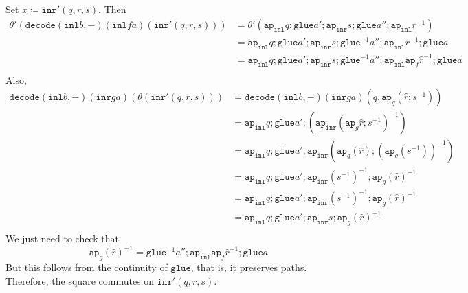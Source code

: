 \message{ !name(notes.tex)}\documentclass[12pt]{amsart}
\newcommand{\inv}{^{-1}}
\newcommand{\type}[1]{\mathtt{#1}}
\newcommand{\ap}{\type{ap}}
\newcommand{\inl}{\type{inl}}
\newcommand{\inr}{\type{inr}}
\newcommand{\glue}{\type{glue}}
\newcommand{\decode}{\type{decode}}
\theoremstyle{remark}
\theoremstyle{definition}
\begin{document}
Set \( x \coloneqq \inr' ( q,r,s ) \). Then
\begin{align*}
  \theta' ( \decode (\inl b,-) ( \inl fa ) ( \inr' ( q,r,s ) ) )
  & = \theta' ( \ap_{\inl} q ; \glue a' ; \ap_{\inr} s ; \glue a'' ;
    \ap_{\inl} r^{-1} ) \\
  & =  \ap_{\inl} q ; \glue a' ; \ap_{\inr} s ; \glue^{-1} a'' ;
    \ap_{\inl} r^{-1} ; \glue a \\
   & =  \ap_{\inl} q ; \glue a' ; \ap_{\inr} s ; \glue^{-1} a'' ;
    \ap_{\inl} \ap_f \hat{r}^{-1} ; \glue a \\
\end{align*}
Also,
\begin{align*}
  \decode ( \inl b , - ) ( \inr ga ) ( \theta ( \inr' ( q,r,s ) ) )
  & = \decode ( \inl b , - )( \inr ga )( q , \ap_g ( \hat{r} ; s^{-1}
    ) ) \\
  & = \ap_{\inl} q ; \glue a' ; ( \ap_{\inr} ( \ap_g \hat{r} ; s^{-1} )^{-1} ) \\
  & = \ap_{\inl} q ; \glue a' ; \ap_{\inr} ( \ap_g ( \hat{r} ) ; ( \ap_g
    (s^{-1}) )^{-1} ) \\
  & = \ap_{\inl} q ; \glue a' ; \ap_{\inr} (s^{-1})^{-1} ;  \ap_g ( \hat{r} )^{-1} \\
  & = \ap_{\inl} q ; \glue a' ; \ap_{\inr} (s^{-1})^{-1} ;  \ap_g ( \hat{r} )^{-1} \\
  & = \ap_{\inl} q ; \glue a' ; \ap_{\inr} s ;  \ap_g ( \hat{r} )^{-1} \\
\end{align*}
We just need to check that
\[
  \ap_g ( \hat{r} )\inv = \glue\inv a'' ; \ap_{ \inl } \ap_f
  \hat{r}\inv ; \glue a
\]
But this follows from the continuity of \( \glue \), that is, it
preserves paths. Therefore, the square commutes on \( \inr' ( q,r,s )
\).
\end{document}
